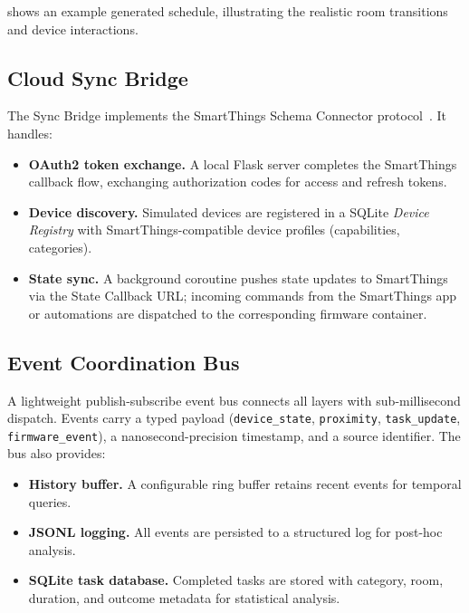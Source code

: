 

 shows an example generated schedule,
illustrating the realistic room transitions and device interactions.

\subsection{Cloud Sync Bridge}

The Sync Bridge implements the SmartThings Schema Connector
protocol~\cite{smartthings-schema}.  It handles:
\begin{itemize}[leftmargin=*]
  \item \textbf{OAuth2 token exchange.}  A local Flask server
    completes the SmartThings callback flow, exchanging authorization
    codes for access and refresh tokens.
  \item \textbf{Device discovery.}  Simulated devices are registered
    in a SQLite \emph{Device Registry} with SmartThings-compatible
    device profiles (capabilities, categories).
  \item \textbf{State sync.}  A background coroutine pushes state
    updates to SmartThings via the State Callback URL; incoming
    commands from the SmartThings app or automations are dispatched
    to the corresponding firmware container.
\end{itemize}

\subsection{Event Coordination Bus}

A lightweight publish-subscribe event bus connects all layers with
sub-millisecond dispatch.  Events carry a typed payload
(\texttt{device\_state}, \texttt{proximity}, \texttt{task\_update},
\texttt{firmware\_event}), a nanosecond-precision timestamp, and a
source identifier.  The bus also provides:
\begin{itemize}[leftmargin=*]
  \item \textbf{History buffer.}  A configurable ring buffer retains
    recent events for temporal queries.
  \item \textbf{JSONL logging.}  All events are persisted to a
    structured log for post-hoc analysis.
  \item \textbf{SQLite task database.}  Completed tasks are stored
    with category, room, duration, and outcome metadata for
    statistical analysis.
\end{itemize}

